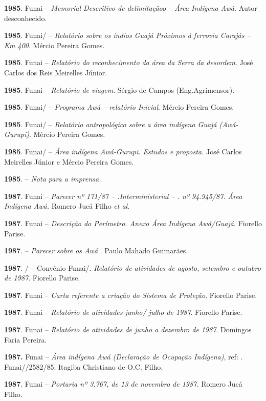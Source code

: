 \begin{Parskip}
\textbf{1985}. Funai -- \emph{Memorial Descritivo de delimitaçãoo --
Área Indígena Awá.} Autor desconhecido.

\textbf{1985}. Funai/ -- \emph{Relatório sobre os índios Guajá
Próximos à ferrovia Carajás -- Km 400}. Mércio Pereira Gomes.

\textbf{1985}. Funai -- \emph{Relatório do reconhecimento da área da
Serra da desordem}. José Carlos dos Reis Meirelles Júnior.

\textbf{1985}. Funai -- \emph{Relatório de viagem}. Sérgio de Campos
(Eng.Agrimensor).

\textbf{1985}. Funai/ -- \emph{Programa Awá -- relatório Inicial}.
Mércio Pereira Gomes.

\textbf{1985}. Funai/ -- \emph{Relatório antropológico sobre a área
indígena Guajá (Awá-Gurupi)}. Mércio Pereira Gomes.

\textbf{1985}. Funai/  -- \emph{Área indígena Awá-Gurupi. Estudos e
proposta.} José Carlos Meirelles Júnior e Mércio Pereira Gomes.

\textbf{1985}.  -- \emph{Nota para a imprensa.}

\textbf{1987}. Funai -- \emph{Parecer nº 171/87 -- .Interministerial
-- . nº 94.945/87. Área Indígena Awá.} Romero Jucá Filho \emph{et
al}.

\textbf{1987}. Funai -- \emph{Descrição do Perímetro. Anexo Área Indígena
Awá/Guajá}. Fiorello Parise.

\textbf{1987}.  -- \emph{Parecer sobre os Awá} . Paulo Mahado
Guimarães.

\textbf{1987}. /  -- Convênio Funai/. \emph{Relatório de
atividades de agosto, setembro e outubro de 1987}. Fiorello Parise.

\textbf{1987}. Funai -- \emph{Carta referente a criação do Sistema de
Proteção}. Fiorello Parise.

\textbf{1987}. Funai -- \emph{Relatório de atividades junho/ julho de
1987}. Fiorello Parise.

\textbf{1987}. Funai -- \emph{Relatório de atividades de junho a dezembro
de 1987}. Domingos Faria Pereira.

\textbf{1987.} Funai -- \emph{Área indígena Awá (Declaração de Ocupação
Indígena)}, ref: . Funai//2582/85. Itagiba Christiano de O.C.
Filho.

\textbf{1987}. Funai -- \emph{Portaria nº 3.767, de 13 de novembro de
1987.} Romero Jucá Filho.


\end{Parskip}

